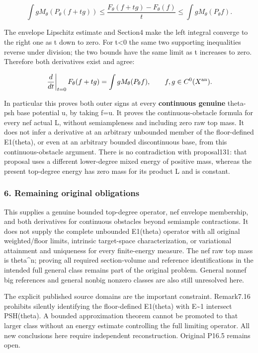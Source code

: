 \documentclass[
  10pt,
]{article}
\begin{document}
\[\int gM_\theta(P_\theta(f+tg))\leq
\frac{F_\theta(f+tg)-F_\theta(f)}t\leq
\int gM_\theta(P_\theta f).\]

The envelope Lipschitz estimate and Section4 make the left integral
converge to the right one as t down to zero. For t\textless0 the same
two supporting inequalities reverse under division; the two bounds have
the same limit as t increases to zero. Therefore both derivatives exist
and agree:

\[\left.\frac{d}{dt}\right|_{t=0}F_\theta(f+tg)=\int gM_\theta(P_\theta f),\qquad f,g\in C^0(X^{\rm an}).\]

In particular this proves both outer signs at every \textbf{continuous
genuine} theta-psh base potential u, by taking f=u. It proves the
continuous-obstacle formula for every nef actual L, without
semiampleness and including zero raw top mass. It does not infer a
derivative at an arbitrary unbounded member of the floor-defined
E1(theta), or even at an arbitrary bounded discontinuous base, from this
continuous-obstacle argument. There is no contradiction with
proposal131: that proposal uses a different lower-degree mixed energy of
positive mass, whereas the present top-degree energy has zero mass for
its product L and is constant.

\subsubsection{6. Remaining original
obligations}\label{remaining-original-obligations}

This supplies a genuine bounded top-degree operator, nef envelope
membership, and both derivatives for continuous obstacles beyond
semiample contractions. It does not supply the complete unbounded
E1(theta) operator with all original weighted/floor limits, intrinsic
target-space characterization, or variational attainment and uniqueness
for every finite-energy measure. The nef raw top mass is theta\^{}n;
proving all required section-volume and reference identifications in the
intended full general class remains part of the original problem.
General nonnef big references and general nonbig nonzero classes are
also still unresolved here.

The explicit published source domains are the important constraint.
Remark7.16 prohibits silently identifying the floor-defined E1(theta)
with E\textasciitilde1 intersect PSH(theta). A bounded approximation
theorem cannot be promoted to that larger class without an energy
estimate controlling the full limiting operator. All new conclusions
here require independent reconstruction. Original P16.5 remains open.
\end{document}
